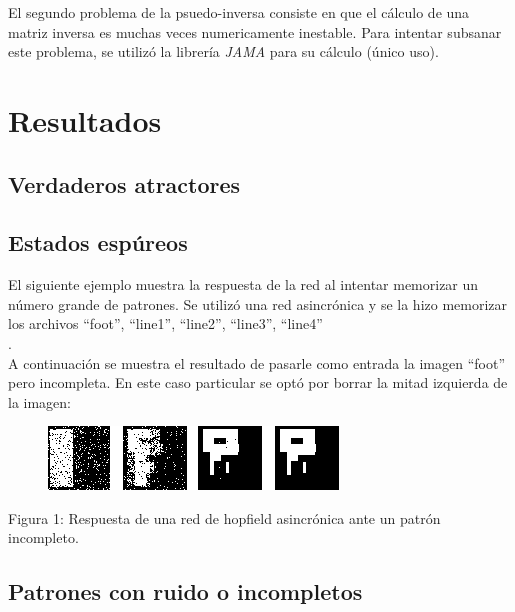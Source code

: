 \documentclass[%
    final,
    reprint,
    notitlepage,
    narroweqnarray,
    inline,
    twoside,
    invited
    ]{ieee}
\begin{document}
\par El segundo problema de la psuedo-inversa consiste en que el cálculo de una matriz inversa 
es muchas veces numericamente inestable. Para intentar subsanar este problema, se utilizó la librería \textit{JAMA} 
para su cálculo (único uso).



\section{Resultados}

\subsection{Verdaderos atractores} 

\subsection{Estados espúreos}

\par El siguiente ejemplo muestra la respuesta de la red al intentar memorizar un número grande de patrones. Se utilizó una red asincrónica y se la hizo memorizar los archivos ``foot'', ``line1'', ``line2'', ``line3'', ``line4''\\.\\
A continuación se muestra el resultado de pasarle como entrada la imagen ``foot'' pero incompleta. En este caso particular se optó por borrar la mitad izquierda de la imagen: \\

\begin{figure}[H]
\begin{center}
\includegraphics[scale=0.60]{./images/espureo.png}
\label{modelado}
\end{center}
\end{figure}

\begin{center}
\par Figura 1: Respuesta de una red de hopfield asincrónica ante un patrón incompleto.
\end{center}

\subsection{Patrones con ruido o incompletos}
\end{document}
